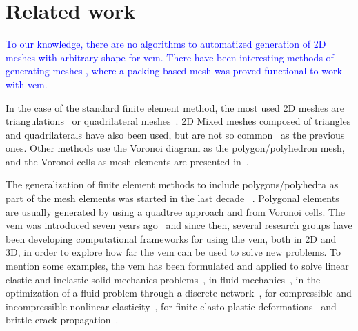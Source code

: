 \documentclass[pdflatex,sn-mathphys]{sn-jnl}%
\theoremstyle{thmstyleone}%
\theoremstyle{thmstyletwo}%
\theoremstyle{thmstylethree}%
\begin{document}
\section{Related work}
\label{sec:relatedwork}


\textcolor{blue}{To our knowledge, there are no algorithms to automatized generation of 2D meshes with arbitrary shape for {\sc vem}. There have been interesting methods of generating meshes \cite{PackingJoaquin}, where a packing-based mesh was proved functional to work with {\sc vem}.} %

In the case of the standard finite element method, the most used 2D meshes are triangulations~\cite{chew1,Shewchuk96,Detri2} or quadrilateral meshes~\cite{Canann98,Lee20031055,Owen98advancingfront}. 2D Mixed meshes composed of triangles and quadrilaterals have also been used, but are not so common~\cite{gildaDiss} as the previous ones. Other methods use the Voronoi diagram as the polygon/polyhedron mesh, and the Voronoi cells as mesh elements are presented in~\cite{YanWLL10,EbeidaM11,SiegerAB10}.
 
The generalization of finite element methods to include polygons/polyhedra as part of the mesh elements was started in the last decade ~\cite{Sukumar2006,tabarraei2008extended,NATARAJAN2017218}.  Polygonal elements are usually generated by using a quadtree approach and from Voronoi cells. The {\sc vem} was introduced seven years  ago~\cite{Basisprinciples,Brezzi2015} and since then, several research groups have been developing computational frameworks  for using the {\sc vem}, both in 2D and 3D, in order to explore how far the {\sc vem} can be used to solve new problems. To mention some  examples, the {\sc vem} has been formulated and applied to solve linear elastic and inelastic solid mechanics problems~\cite{da2015virtual}, in fluid mechanics~\cite{caceres2015mixed}, in the optimization
of  a fluid problem through a discrete network~\cite{benedetto2014virtual}, for compressible and incompressible nonlinear elasticity~\cite{Wriggers2017}, for finite elasto-plastic deformations~\cite{Wriggers2017a} and brittle crack propagation~\cite{HUSSEIN201915}.
\end{document}
